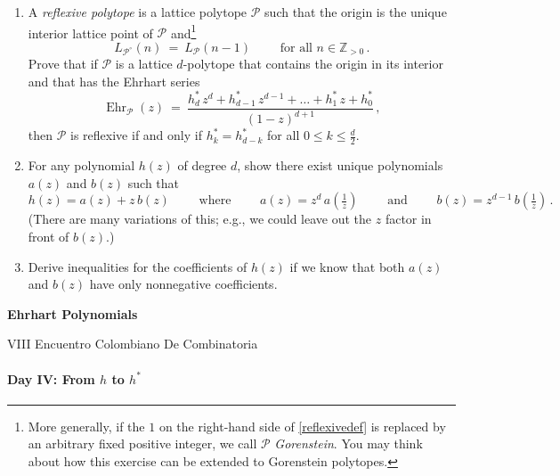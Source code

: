\documentclass[11pt]{article}
\def\cP{\mathcal{P}}
\def\ZZ{\mathbb{Z}}
\newcommand\Ehr{\operatorname{Ehr}}
\begin{document}
\begin{enumerate}[(1)]
\item A \emph{reflexive polytope}
is a lattice polytope $\cP$ such that the origin is the unique interior lattice point of
$\cP$ and\footnote{More generally, if the $1$ on the right-hand side of \eqref{reflexivedef}
is replaced by an arbitrary fixed positive integer, we call $\cP$ \emph{Gorenstein}. You may
think about how this exercise can be extended to Gorenstein polytopes.}
\begin{equation}\label{reflexivedef}
  L_{ \cP^\circ } (n) \ = \ L_\cP (n-1)
  \qquad \text{ for all } n \in \ZZ_{ >0 }  \, .
\end{equation}
Prove that if $\cP$ is a lattice $d$-polytope that contains the origin in its interior and that has the Ehrhart series
\[
  \Ehr_\cP(z) \ = \ \frac{ h^*_d \, z^d + h^*_{ d-1 } \, z^{ d-1 } + \dots + h^*_1 \, z + h^*_0 }{ (1-z)^{ d+1 } } \, ,
\]
then $\cP$ is reflexive if and only if $ h^*_k = h^*_{ d-k }$ for all $0 \le k
\le \frac d 2$.

\item For any polynomial $h(z)$ of degree $d$, show there exist unique polynomials $a(z)$ and $b(z)$ such that
\[
  h(z) = a(z) + z \, b(z)
  \qquad \text{ where } \qquad a(z) = z^d \, a(\tfrac 1 z) \qquad \text{ and } \qquad b(z) = z^{ d-1 } \, b(\tfrac 1 z) \, .
\]
(There are many variations of this; e.g., we could leave out the $z$ factor in front of $b(z)$.)

\item Derive inequalities for the coefficients of $h(z)$ if we know that both $a(z)$ and $b(z)$ have only nonnegative
coefficients.

\end{enumerate}

\newpage
\begin{center}
\Large{\bf Ehrhart Polynomials} 

\normalsize
VIII Encuentro Colombiano De Combinatoria
\end{center}

\paragraph{Day IV: From $h$ to $h^*$}
\end{document}
